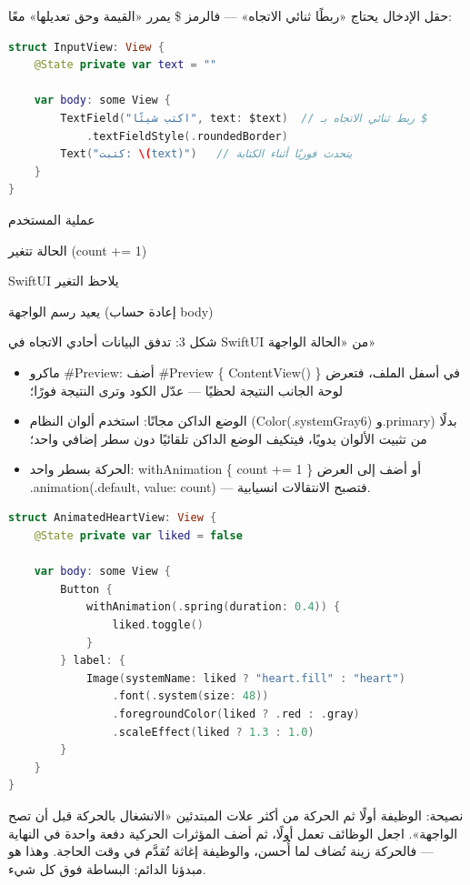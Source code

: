 حقل الإدخال يحتاج «ربطًا ثنائي الاتجاه» — فالرمز \$ يمرر «القيمة وحق تعديلها» معًا:

\begin{lstlisting}[language=Swift]
struct InputView: View {
    @State private var text = ""

    var body: some View {
        TextField("اكتب شيئًا", text: $text)  // ربط ثنائي الاتجاه بـ $
            .textFieldStyle(.roundedBorder)
        Text("كتبت: \(text)")   // يتحدث فوريًا أثناء الكتابة
    }
}
\end{lstlisting}

عملية المستخدم

الحالة تتغير (count += 1)

SwiftUI يلاحظ التغير

يعيد رسم الواجهة (إعادة حساب body)

\begin{center}\small\color{gray}شكل 3: تدفق البيانات أحادي الاتجاه في SwiftUI من «الحالة الواجهة»\end{center}


\begin{itemize}
  \item ماكرو \#Preview: أضف \#Preview \{ ContentView() \} في أسفل الملف، فتعرض لوحة الجانب النتيجة لحظيًا — عدّل الكود وترى النتيجة فورًا؛
  \item الوضع الداكن مجانًا: استخدم ألوان النظام (Color(.systemGray6) و.primary) بدلًا من تثبيت الألوان يدويًا، فيتكيف الوضع الداكن تلقائيًا دون سطر إضافي واحد؛
  \item الحركة بسطر واحد: withAnimation \{ count += 1 \} أو أضف إلى العرض .animation(.default, value: count) — فتصبح الانتقالات انسيابية.
\end{itemize}

\begin{lstlisting}[language=Swift]
struct AnimatedHeartView: View {
    @State private var liked = false

    var body: some View {
        Button {
            withAnimation(.spring(duration: 0.4)) {
                liked.toggle()
            }
        } label: {
            Image(systemName: liked ? "heart.fill" : "heart")
                .font(.system(size: 48))
                .foregroundColor(liked ? .red : .gray)
                .scaleEffect(liked ? 1.3 : 1.0)
        }
    }
}
\end{lstlisting}

\begin{tcbinfo}{نصيحة: الوظيفة أولًا ثم الحركة}
من أكثر علات المبتدئين «الانشغال بالحركة قبل أن تصح الواجهة». اجعل الوظائف تعمل أولًا، ثم أضف المؤثرات الحركية دفعة واحدة في النهاية — فالحركة زينة تُضاف لما أُحسن، والوظيفة إغاثة تُقدَّم في وقت الحاجة. وهذا هو مبدؤنا الدائم: البساطة فوق كل شيء.

\end{tcbinfo}

